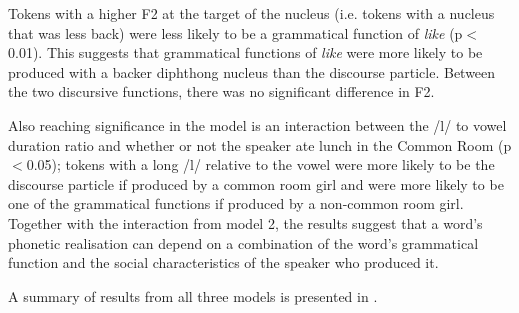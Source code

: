 Tokens with a higher F2 at the target of the nucleus (i.e. tokens with a nucleus that was less back) were less likely to be a grammatical function of \textit{like} (p$<$0.01). This suggests that grammatical functions of \textit{like} were more likely to be produced with a backer diphthong nucleus than the discourse particle. Between the two discursive functions, there was no significant difference in F2.

Also reaching significance in the model is an interaction between the /l/ to vowel duration ratio and whether or not the speaker ate lunch in the Common Room (p$<$0.05); tokens with a long /l/ relative to the vowel were more likely to be the discourse particle if produced by a common room girl and were more likely to be one of the grammatical functions if produced by a non-common room girl. Together with the interaction from model 2, the results suggest that a word's phonetic realisation can depend on a combination of the word's grammatical function and the social characteristics of the speaker who produced it.


A summary of results from all three models is presented in .

